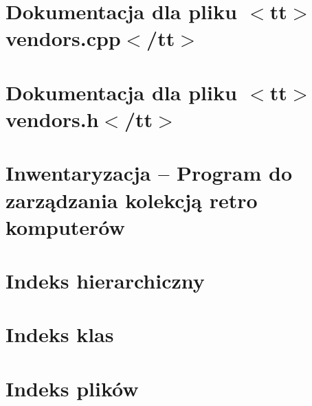 \documentclass[twoside]{book}
\newcommand{\+}{\discretionary{\mbox{\scriptsize$\hookleftarrow$}}{}{}}
\begin{document}
\chapter{Dokumentacja dla pliku \texorpdfstring{$<$}{<}tt\texorpdfstring{$>$}{>}vendors.\+cpp\texorpdfstring{$<$}{<}/tt\texorpdfstring{$>$}{>}}
\label{md_documentation_vendors_cpp}

\chapter{Dokumentacja dla pliku \texorpdfstring{$<$}{<}tt\texorpdfstring{$>$}{>}vendors.\+h\texorpdfstring{$<$}{<}/tt\texorpdfstring{$>$}{>}}
\label{md_documentation_vendors_h}

\chapter{Inwentaryzacja – Program do zarządzania kolekcją retro komputerów}
\label{md__r_e_a_d_m_e}

\chapter{Indeks hierarchiczny}

\chapter{Indeks klas}

\chapter{Indeks plików}

\end{document}
